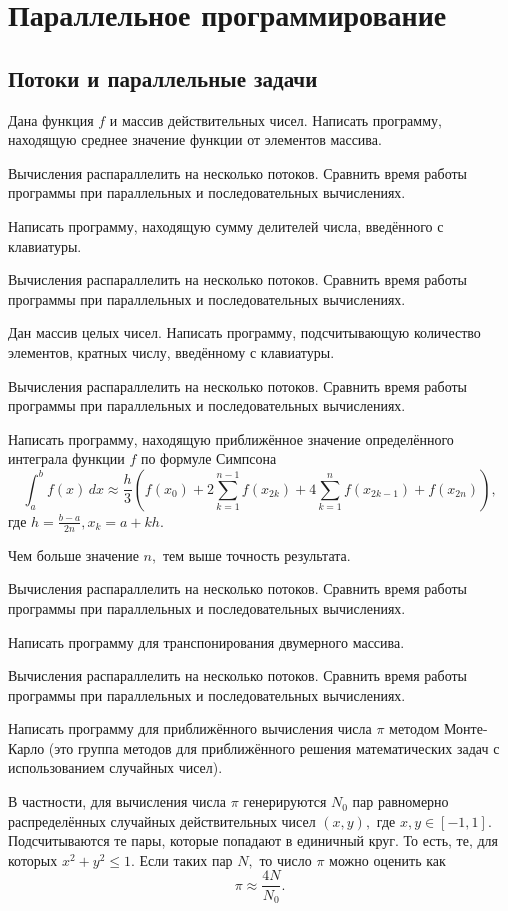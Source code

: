 \section{Параллельное программирование}

\subsection{Потоки и параллельные задачи}

\task Дана функция $f$ и массив действительных чисел. Написать
программу, находящую среднее значение функции от элементов
массива.

Вычисления распараллелить на несколько потоков. Сравнить время работы
программы при параллельных и последовательных вычислениях.

\task Написать программу, находящую сумму делителей числа, введённого
с клавиатуры.

Вычисления распараллелить на несколько потоков. Сравнить время работы
программы при параллельных и последовательных вычислениях.

\task Дан массив целых чисел. Написать программу, подсчитывающую
количество элементов, кратных числу, введённому с клавиатуры.

Вычисления распараллелить на несколько потоков. Сравнить время работы
программы при параллельных и последовательных вычислениях.

\task Написать программу, находящую приближённое значение
определённого интеграла функции $f$ по формуле Симпсона
\[
\int_a^b f(x)\,dx \approx \frac{h}3 \left(
  f(x_0) + 2\sum_{k=1}^{n-1} f(x_{2k}) + 4\sum_{k=1}^n f(x_{2k-1}) + f(x_{2n})
\right),
\]
где $h = \frac{b-a}{2n}, x_k=a+kh.$ 

Чем больше значение $n,$ тем выше точность результата.

Вычисления распараллелить на несколько потоков. Сравнить время работы
программы при параллельных и последовательных вычислениях.

\task Написать программу для транспонирования двумерного массива.

Вычисления распараллелить на несколько потоков. Сравнить время работы
программы при параллельных и последовательных вычислениях.

\task Написать программу для приближённого вычисления числа $\pi$
методом Монте-Карло (это группа методов для приближённого решения
математических задач с использованием случайных чисел).

В частности, для вычисления числа $\pi$ генерируются $N_0$ пар
равномерно распределённых случайных действительных чисел
$(x, y),$ где $x, y \in [-1, 1].$ Подсчитываются те пары, которые попадают в
единичный круг. То есть, те, для которых $x^2+y^2 \leqslant 1.$ Если
таких пар $N,$ то число $\pi$ можно оценить как
\[
\pi \approx \frac{4N}{N_0}.
\]

